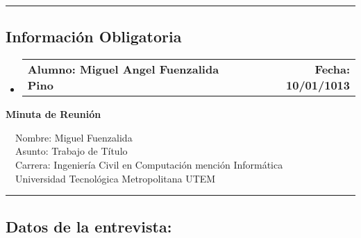\documentclass[10pt,letterpaper]{article}
\makeatletter
\newcommand{\headerrow}[2]
{\begin{tabular*}{\linewidth}{l@{\extracolsep{\fill}}r}
	#1 &
	#2 \\
\end{tabular*}}
\makeatother
\begin{document}
\hrule
\vspace{-0.4em}
\subsection*{Información Obligatoria}

\begin{itemize}
	\parskip=0.1em

	\item 
	\headerrow
		{\textbf{Alumno: Miguel Angel Fuenzalida Pino}}
		{\textbf{Fecha: 10/01/1013}}

\end{itemize}
\newpage
\begin{center}
{\LARGE \textbf{Minuta de Reunión}}

\ \ \textbullet Nombre: Miguel Fuenzalida
\\
\ \ \textbullet Asunto: Trabajo de Título
\\
\ \ \textbullet Carrera: Ingeniería Civil en Computación mención Informática
\\
\ \ \textbullet Universidad Tecnológica Metropolitana UTEM
\end{center}

\hrule
\vspace{-0.4em}
\subsection*{Datos de la entrevista:}
\end{document}
